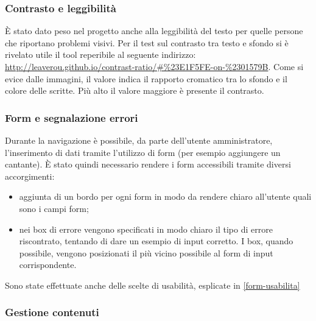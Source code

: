 \subsubsection{Contrasto e leggibilit\`a}
\`E stato dato peso nel progetto anche alla leggibilit\`a del testo per quelle persone che riportano problemi visivi. Per il test sul contrasto tra testo e sfondo si \`e rivelato utile il tool reperibile al seguente indirizzo: \url{http://leaverou.github.io/contrast-ratio/#\%23E1F5FE-on-\%2301579B}.
Come si evice dalle immagini, il valore indica il rapporto cromatico tra lo sfondo e il colore delle scritte. Più alto il valore maggiore è presente il contrasto. %

\subsubsection{Form e segnalazione errori}
\label{form-accessibilita}
Durante la navigazione è possibile, da parte dell'utente amministratore, l'inserimento di dati tramite l'utilizzo di form (per esempio aggiungere un cantante). È stato quindi necessario rendere i form accessibili tramite diversi accorgimenti:
\begin{itemize}

    \item aggiunta di un bordo per ogni form in modo da rendere chiaro all'utente quali sono i campi form;
    \item nei box di errore vengono specificati in modo chiaro il tipo di errore riscontrato, tentando di dare un esempio di input corretto. I box, quando possibile, vengono posizionati il più vicino possibile al form di input corrispondente.

\end{itemize}
Sono state effettuate anche delle scelte di usabilità, esplicate in \ref{form-usabilita}

\subsubsection{Gestione contenuti}

